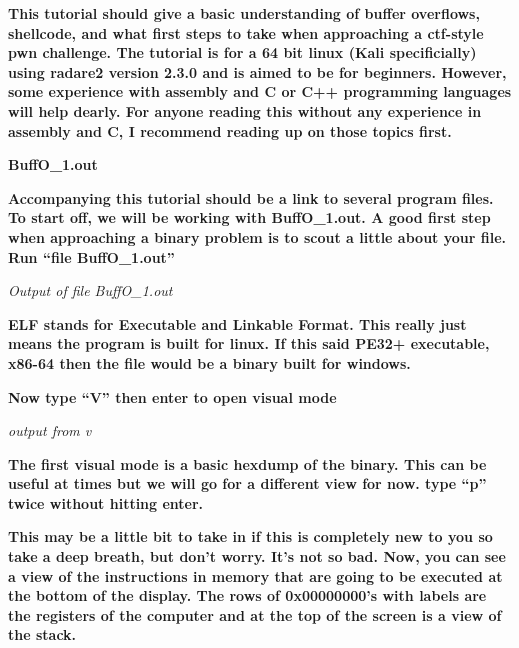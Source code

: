 \documentclass[letterpaper]{article}
\newcommand{\sitfig}[3]{
\begin{figure}[H]
\centering
\makebox[\textwidth][c]{
#2
}
\label{#1}
\end{figure}
}
\newcommand{\sitgfx}[4][scale=1.0]{
\sitfig{#3}{\texttt{[image: \#2]}}{#4}
}
\begin{document}
\textbf{This tutorial should give a basic understanding of buffer overflows, shellcode, and what first steps to take
when approaching a ctf-style pwn challenge. The tutorial is for a 64 bit linux (Kali specificially) using radare2
version 2.3.0 and is aimed to be for beginners. However, some experience with assembly and C or C++ programming
languages will help dearly. For anyone reading this without any experience in assembly and C, I recommend reading up on
those topics first.}

\textbf{BuffO\_1.out}

\textbf{Accompanying this tutorial should be a link to several program files. To start off, we will be working with
BuffO\_1.out. A good first step when approaching a binary problem is to scout a little about your file. Run ``file
BuffO\_1.out''}

  
\sitgfx[width=5.8335in,height=0.7665in]{FINALWORKINGDOCFORMERLYPRECURSOR-img073.png}{fig:unk}{TODO CAPTION}
 

\textit{Output of file BuffO\_1.out}

\textbf{ELF stands for Executable and Linkable Format. This really just means the program is built for linux. If this
said PE32+ executable, x86-64 then the file would be a binary built for windows.}

  
\sitgfx[width=5.8335in,height=0.9602in]{FINALWORKINGDOCFORMERLYPRECURSOR-img074.png}{fig:unk}{TODO CAPTION}
 

  
\sitgfx[width=5.8335in,height=3.6457in]{FINALWORKINGDOCFORMERLYPRECURSOR-img075.png}{fig:unk}{TODO CAPTION}
 

\textbf{Now type ``V'' then enter to open visual mode}

  
\sitgfx[width=5.8335in,height=3.6457in]{FINALWORKINGDOCFORMERLYPRECURSOR-img076.png}{fig:unk}{TODO CAPTION}
 

\textit{output from v}

\textbf{The first visual mode is a basic hexdump of the binary. This can be useful at times but we will go for a
different view for now. type ``p'' twice without hitting enter.}

  
\sitgfx[width=5.8335in,height=3.6457in]{FINALWORKINGDOCFORMERLYPRECURSOR-img077.png}{fig:unk}{TODO CAPTION}
 

\textbf{This may be a little bit to take in if this is completely new to you so take a deep breath, but don't worry.
It's not so bad. Now, you can see a view of the instructions in memory that are going to be executed at the bottom of
the display. The rows of 0x00000000's with labels are the registers of the computer and at the top of the screen is a
view of the stack.}
\end{document}
